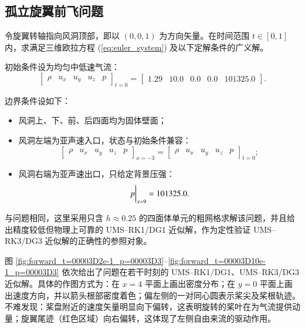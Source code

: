 \subsection{孤立旋翼前飞问题}
\begin{problem}
[孤立旋翼前飞]\label{prob:=005B64=007ACB=0065CB=007FFC=00524D=0098DE}令旋翼转轴指向风洞顶部，即以
$(0,0,1)$ 为方向矢量。在时间范围 $t\in[0,1]$ 内，求满足三维欧拉方程 (\ref{eq:euler_system})
及以下定解条件的广义解。

初始条件设为均匀中低速气流：
\begin{equation}
\begin{bmatrix}\rho & u_{x} & u_{y} & u_{z} & p\end{bmatrix}_{t=0}=\begin{bmatrix}1.29 & 10.0 & 0.0 & 0.0 & 101325.0\end{bmatrix}.
\end{equation}

边界条件设如下：
\begin{itemize}
\item 风洞上、下、前、后四面均为固体壁面；
\item 风洞左端为亚声速入口，状态与初始条件兼容：
\begin{equation}
\begin{bmatrix}\rho & u_{x} & u_{y} & u_{z} & p\end{bmatrix}_{x=-3}=\begin{bmatrix}\rho & u_{x} & u_{y} & u_{z} & p\end{bmatrix}_{t=0};
\end{equation}
\item 风洞右端为亚声速出口，只给定背景压强：
\begin{equation}
\eval{p}_{x=9}=101325.0.
\end{equation}
\end{itemize}
\end{problem}

与问题相同，这里采用只含
$h\approx0.25$ 的四面体单元的粗网格求解该问题，并且给出精度较低但物理上可靠的 UMS–RK1/DG1 近似解，作为定性验证
UMS–RK3/DG3 近似解的正确性的参照对象。

图 \ref{fig:forward_t=00003D2e-1_p=00003D3}–\ref{fig:forward_t=00003D10e-1_p=00003D3}
依次给出了问题在若干时刻的
UMS–RK1/DG1、UMS–RK3/DG3 近似解。具体的作图方式为：在 $x=4$ 平面上画出密度分布；在 $y=0$ 平面上画出速度方向，并以箭头根部密度着色；偏左侧的一对同心圆表示桨尖及桨根轨迹。不难发现：桨盘附近的速度矢量明显向下偏转，这表明旋转的桨叶在为气流提供动量；旋翼尾迹（红色区域）向右偏转，这体现了左侧自由来流的驱动作用。

